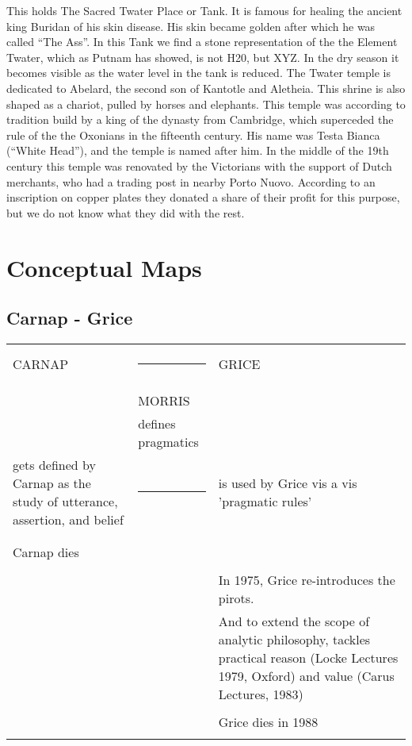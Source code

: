\documentclass[10pt,titlepage]{book}
\begin{document}
This holds The Sacred Twater Place or Tank. It is famous for healing
the ancient king Buridan of his skin disease. His skin became golden
after which he was called ``The Ass''. In this Tank we find a stone
representation of the the Element Twater, which as Putnam has showed,
is not H20, but XYZ. In the dry season it becomes visible as the water
level in the tank is reduced. The Twater temple is dedicated to
Abelard, the second son of Kantotle and Aletheia. This shrine is also
shaped as a chariot, pulled by horses and elephants. This temple was
according to tradition build by a king of the dynasty from Cambridge,
which superceded the rule of the the Oxonians in the fifteenth century.
His name was Testa Bianca (``White Head''), and the temple is named after
him. In the middle of the 19th century this temple was renovated by the
Victorians with the support of Dutch merchants, who had a trading post
in nearby Porto Nuovo. According to an inscription on copper plates
they donated a share of their profit for this purpose, but we do not
know what they did with the rest.

\chapter{Conceptual Maps}

\section{Carnap - Grice}

\pagebreak

\begin{centering}
\begin{tabular}{p{3cm} p{2.5cm} p{3cm}}

\hline\\

CARNAP&\hrule&GRICE\\

\hline\\

\hline\\

&MORRIS&\\
&defines pragmatics&\\

gets defined by Carnap as the study of utterance, assertion, and belief
& \hrule
& is used by Grice vis a vis 'pragmatic rules'\\

\hline\\
\hline\\
Carnap dies\\
\hline\\
&& In 1975, Grice re-introduces the pirots.\\
&&
And to extend the scope of
analytic philosophy, tackles
practical reason (Locke Lectures
1979, Oxford) and value (Carus
Lectures, 1983)\\
\hline\\
&&Grice dies in 1988\\
\hline\\
\end{tabular}
\end{centering}
\end{document}
